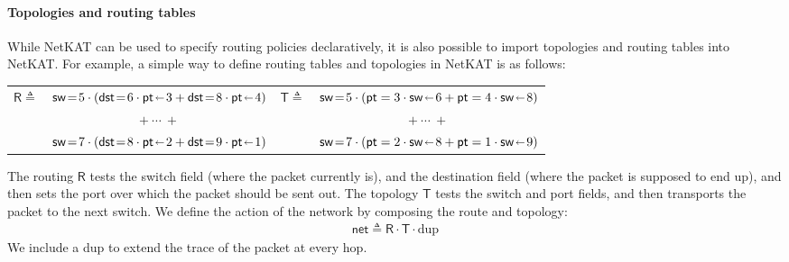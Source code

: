 \documentclass[acmsmall,dvipsnames,nonacm]{acmart}
\begin{document}
\paragraph{Topologies and routing tables}
While NetKAT can be used to specify routing policies declaratively, it is also possible to import topologies and routing tables into NetKAT.
For example, a simple way to define routing tables and topologies in NetKAT is as follows:

\medskip
\noindent
\begin{tabular}{lc@{\ \ \ \ }|@{\ \ \ \ }lc}

    $\mathsf{R} \triangleq$\!\!\!\!&$\sw \test 5 \cdot (\dst \test 6 \cdot \pt \mut 3 + \dst \test 8 \cdot \pt \mut 4)$&
    $\mathsf{T} \triangleq$\!\!\!\!&$\mathsf{sw} \mathrel{\!=\!} 5 \cdot (\mathsf{pt}=3 \cdot \mathsf{sw} \mathrel{\!\shortleftarrow\!} 6 + \mathsf{pt}=4 \cdot \mathsf{sw} \mathrel{\!\shortleftarrow\!} 8)$ \\
%
%
        &$+\ \cdots\ +$&
        &$+\ \cdots\ +$\\
%
        &$ \sw \test 7 \cdot (\dst \test 8 \cdot \pt \mut 2 + \dst \test 9 \cdot \pt \mut 1) $&
        &$ \mathsf{sw} \mathrel{\!=\!} 7 \cdot (\mathsf{pt}=2 \cdot \mathsf{sw} \mathrel{\!\shortleftarrow\!} 8 + \mathsf{pt}=1 \cdot \mathsf{sw} \mathrel{\!\shortleftarrow\!} 9)$
\end{tabular}
\medskip

The routing $\mathsf{R}$ tests the switch field (where the packet currently is), and the destination field (where the packet is supposed to end up), and then sets the port over which the packet should be sent out.
The topology $\mathsf{T}$ tests the switch and port fields, and then transports the packet to the next switch.
We define the action of the network by composing the route and topology:
\begin{align*}
    \mathsf{net} \triangleq \mathsf{R} \cdot \mathsf{T} \cdot \text{dup}
\end{align*}
We include a dup to extend the trace of the packet at every hop.
\end{document}
